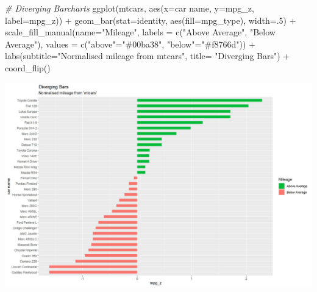 \documentclass[
]{article}
\newenvironment{Shaded}{\begin{snugshade}}{\end{snugshade}}
\newcommand{\AttributeTok}[1]{\textcolor[rgb]{0.77,0.63,0.00}{#1}}
\newcommand{\CommentTok}[1]{\textcolor[rgb]{0.56,0.35,0.01}{\textit{#1}}}
\newcommand{\DecValTok}[1]{\textcolor[rgb]{0.00,0.00,0.81}{#1}}
\newcommand{\FunctionTok}[1]{\textcolor[rgb]{0.00,0.00,0.00}{#1}}
\newcommand{\NormalTok}[1]{#1}
\newcommand{\OtherTok}[1]{\textcolor[rgb]{0.56,0.35,0.01}{#1}}
\newcommand{\SpecialCharTok}[1]{\textcolor[rgb]{0.00,0.00,0.00}{#1}}
\newcommand{\StringTok}[1]{\textcolor[rgb]{0.31,0.60,0.02}{#1}}
\begin{document}
\begin{Shaded}
\begin{Highlighting}[]
\CommentTok{\# Diverging Barcharts}
\FunctionTok{ggplot}\NormalTok{(mtcars, }\FunctionTok{aes}\NormalTok{(}\AttributeTok{x=}\StringTok{\textasciigrave{}}\AttributeTok{car name}\StringTok{\textasciigrave{}}\NormalTok{, }\AttributeTok{y=}\NormalTok{mpg\_z, }\AttributeTok{label=}\NormalTok{mpg\_z)) }\SpecialCharTok{+} 
  \FunctionTok{geom\_bar}\NormalTok{(}\AttributeTok{stat=}\StringTok{\textquotesingle{}identity\textquotesingle{}}\NormalTok{, }\FunctionTok{aes}\NormalTok{(}\AttributeTok{fill=}\NormalTok{mpg\_type), }\AttributeTok{width=}\NormalTok{.}\DecValTok{5}\NormalTok{)  }\SpecialCharTok{+}
  \FunctionTok{scale\_fill\_manual}\NormalTok{(}\AttributeTok{name=}\StringTok{"Mileage"}\NormalTok{, }
                    \AttributeTok{labels =} \FunctionTok{c}\NormalTok{(}\StringTok{"Above Average"}\NormalTok{, }\StringTok{"Below Average"}\NormalTok{), }
                    \AttributeTok{values =} \FunctionTok{c}\NormalTok{(}\StringTok{"above"}\OtherTok{=}\StringTok{"\#00ba38"}\NormalTok{, }\StringTok{"below"}\OtherTok{=}\StringTok{"\#f8766d"}\NormalTok{)) }\SpecialCharTok{+} 
  \FunctionTok{labs}\NormalTok{(}\AttributeTok{subtitle=}\StringTok{"Normalised mileage from \textquotesingle{}mtcars\textquotesingle{}"}\NormalTok{, }
       \AttributeTok{title=} \StringTok{"Diverging Bars"}\NormalTok{) }\SpecialCharTok{+} 
  \FunctionTok{coord\_flip}\NormalTok{()}
\end{Highlighting}
\end{Shaded}

\includegraphics{figures/unnamed-chunk-2-1.jpeg}
\end{document}
